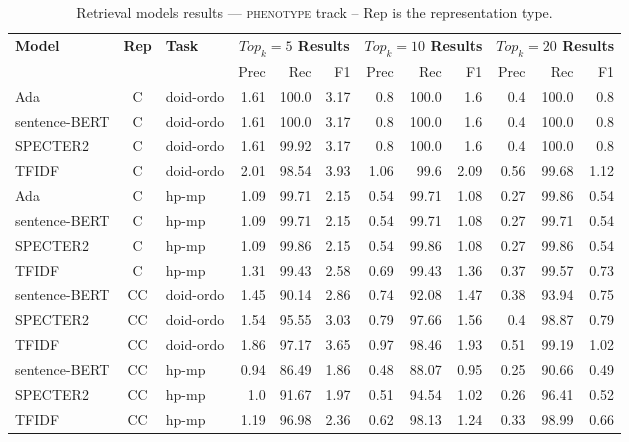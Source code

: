 
    \begin{table}[h]
         \centering
         \caption{Retrieval models results --- \textsc{phenotype} track -- Rep is the representation type.} \label{tab:ir_phenotype}
         \begin{tabular}{|l|c|l|r|r|r|r|r|r|r|r|r|}
             \hline
             \multirow{2}{*}{\textbf{Model}}  & \multirow{2}{*}{\textbf{Rep}}  & \multirow{2}{*}{\textbf{Task}} &  \multicolumn{3}{c|}{\textbf{$Top_k=5$ Results}} &  \multicolumn{3}{c|}{\textbf{$Top_k=10$ Results}} &  \multicolumn{3}{c|}{\textbf{$Top_k=20$ Results}}\\
             \cline{4-12}
              & & & Prec & Rec & F1& Prec & Rec & F1& Prec & Rec & F1 \\
             \hline
    	Ada  & C & doid-ordo  & 1.61 & 100.0 & 3.17 & 0.8 & 100.0 & 1.6 & 0.4 & 100.0 & 0.8\\
	sentence-BERT  & C & doid-ordo  & 1.61 & 100.0 & 3.17 & 0.8 & 100.0 & 1.6 & 0.4 & 100.0 & 0.8\\
	SPECTER2  & C & doid-ordo  & 1.61 & 99.92 & 3.17 & 0.8 & 100.0 & 1.6 & 0.4 & 100.0 & 0.8\\
	TFIDF  & C & doid-ordo  & 2.01 & 98.54 & 3.93 & 1.06 & 99.6 & 2.09 & 0.56 & 99.68 & 1.12\\
	\hline
	Ada  & C & hp-mp  & 1.09 & 99.71 & 2.15 & 0.54 & 99.71 & 1.08 & 0.27 & 99.86 & 0.54\\
	sentence-BERT  & C & hp-mp  & 1.09 & 99.71 & 2.15 & 0.54 & 99.71 & 1.08 & 0.27 & 99.71 & 0.54\\
	SPECTER2  & C & hp-mp  & 1.09 & 99.86 & 2.15 & 0.54 & 99.86 & 1.08 & 0.27 & 99.86 & 0.54\\
	TFIDF  & C & hp-mp  & 1.31 & 99.43 & 2.58 & 0.69 & 99.43 & 1.36 & 0.37 & 99.57 & 0.73\\
	\hline
	sentence-BERT  & CC & doid-ordo  & 1.45 & 90.14 & 2.86 & 0.74 & 92.08 & 1.47 & 0.38 & 93.94 & 0.75\\
	SPECTER2  & CC & doid-ordo  & 1.54 & 95.55 & 3.03 & 0.79 & 97.66 & 1.56 & 0.4 & 98.87 & 0.79\\
	TFIDF  & CC & doid-ordo  & 1.86 & 97.17 & 3.65 & 0.97 & 98.46 & 1.93 & 0.51 & 99.19 & 1.02\\
	\hline
	sentence-BERT  & CC & hp-mp  & 0.94 & 86.49 & 1.86 & 0.48 & 88.07 & 0.95 & 0.25 & 90.66 & 0.49\\
	SPECTER2  & CC & hp-mp  & 1.0 & 91.67 & 1.97 & 0.51 & 94.54 & 1.02 & 0.26 & 96.41 & 0.52\\
	TFIDF  & CC & hp-mp  & 1.19 & 96.98 & 2.36 & 0.62 & 98.13 & 1.24 & 0.33 & 98.99 & 0.66\\

\end{tabular}
\end{table}
